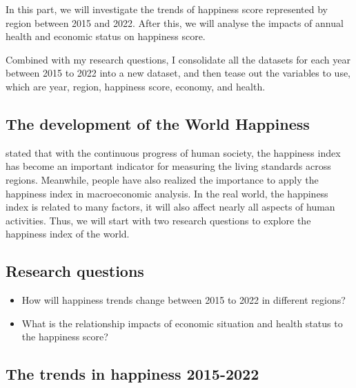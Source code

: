 \documentclass[11pt,a4paper,]{article}
\begin{document}
In this part, we will investigate the trends of happiness score represented by region between 2015 and 2022. After this, we will analyse the impacts of annual health and economic status on happiness score.

Combined with my research questions, I consolidate all the datasets for each year between 2015 to 2022 into a new dataset, and then tease out the variables to use, which are year, region, happiness score, economy, and health.

\hypertarget{the-development-of-the-world-happiness}{%
\subsection{The development of the World Happiness}\label{the-development-of-the-world-happiness}}

\textcite{helliwell2012state} stated that with the continuous progress of human society, the happiness index has become an important indicator for measuring the living standards across regions. Meanwhile, people have also realized the importance to apply the happiness index in macroeconomic analysis. In the real world, the happiness index is related to many factors, it will also affect nearly all aspects of human activities. Thus, we will start with two research questions to explore the happiness index of the world.

\hypertarget{research-questions}{%
\subsection{Research questions}\label{research-questions}}

\begin{itemize}
\item
  How will happiness trends change between 2015 to 2022 in different regions?
\item
  What is the relationship impacts of economic situation and health status to the happiness score?
\end{itemize}

\hypertarget{the-trends-in-happiness-2015-2022}{%
\subsection{The trends in happiness 2015-2022}\label{the-trends-in-happiness-2015-2022}}
\end{document}
